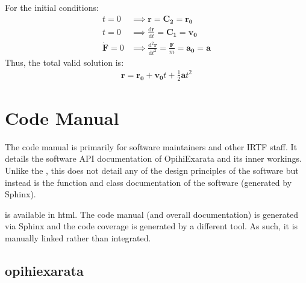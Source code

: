 \documentclass[letterpaper,11pt,english]{sphinxmanual}
\begin{document}
\sphinxAtStartPar
For the initial conditions:
\begin{equation*}
\begin{split}t = 0 &\implies \mathbf{r} = \mathbf{C_2} = \mathbf{r_0} \\
t = 0 &\implies \frac{\mathrm{d}\mathbf{r}}{\mathrm{d}t} = \mathbf{C_1} = \mathbf{v_0} \\
\dot{\mathbf{F}} = 0 &\implies \frac{\mathrm{d}^2\mathbf{r}}{\mathrm{d}t^2} = \frac{\mathbf{F}}{m} = \mathbf{a_0} = \mathbf{a}\end{split}
\end{equation*}
\sphinxAtStartPar
Thus, the total valid solution is:
\begin{equation*}
\begin{split}\mathbf{r} = \mathbf{r_0} + \mathbf{v_0} t + \frac{1}{2} \mathbf{a} t^2\end{split}
\end{equation*}

\chapter{Code Manual}
\label{\detokenize{index:code-manual}}\label{\detokenize{index:home-code-manual}}
\sphinxAtStartPar
The code manual is primarily for software maintainers and other IRTF staff. It
details the software API documentation of OpihiExarata and its inner workings.
Unlike the {\hyperref[\detokenize{index:home-technical-manual}]{}}, this does not detail
any of the design principles of the software but instead is the function and
class documentation of the software (generated by Sphinx).

\sphinxAtStartPar
{}%
\begin{footnote}[56]\sphinxAtStartFootnote
{}
%
\end{footnote} is available in html. The code manual (and overall
documentation) is generated via Sphinx and the code coverage is generated by
a different tool. As such, it is manually linked rather than integrated.

\sphinxstepscope


\section{opihiexarata}
\label{\detokenize{code/modules:opihiexarata}}\label{\detokenize{code/modules::doc}}
\sphinxstepscope
\end{document}
